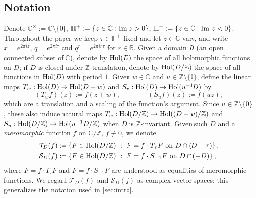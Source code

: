 \documentclass[reqno,11pt]{amsart}
\theoremstyle{definition}
\theoremstyle{remark}
\newtheorem*{remark}{Remark}
\numberwithin{equation}{section}
\newcommand{\Z}{\mathbb{Z}}
\newcommand{\R}{\mathbb{R}}
\newcommand{\C}{\mathbb{C}}
\renewcommand{\H}{{\mathbb{H}}}
\newcommand{\mT}{\mathcal{T}}
\newcommand{\mS}{\mathcal{S}}
\renewcommand{\Im}{\textnormal{Im}\ }
\newcommand{\Hol}{\textnormal{Hol}}
\begin{document}

\subsection{Notation} \label{subsec:notation}
Denote $\C^\times := \C \setminus \{0\}$, $\H^+ := \{z \in \C : \Im z > 0\}$, $\H^- := \{z \in \C : \Im z < 0\}$. Throughout the paper we keep $\tau \in \H^+$ fixed and let $z \in \C$ vary, and write $x = e^{2\pi i z}$, $q = e^{2\pi i \tau}$ and $q^r = e^{2\pi i r \tau}$ for $r \in \R$. Given a domain $D$ (an open connected subset of $\C$), denote by $\Hol(D)$ the space of all holomorphic functions on $D$; if $D$ is closed under $\Z$-translation, denote by $\Hol(D/\Z)$ the space of all functions in $\Hol(D)$ with period $1$. Given $w \in \C$ and $u \in \Z \setminus \{0\}$, define the linear maps $T_w : \Hol(D) \to \Hol(D - w)$ and $S_u : \Hol(D) \to \Hol(u^{-1} D)$ by
\[
    (T_w f)(z) := f(z+w), \qquad\qquad (S_u f)(z) := f(u z),
\]
which are a translation and a scaling of the function's argument. Since $u \in \Z \setminus \{0\}$, these also induce natural maps $T_w : \Hol(D/\Z) \to \Hol((D-w)/\Z)$ and $S_u : \Hol(D/\Z) \to \Hol(u^{-1}D/\Z)$ when $D$ is $\Z$-invariant. Given such $D$ and a \emph{meromorphic} function $f$ on $\C/\Z$, $f \not\equiv 0$, we denote
\begin{align}
    \mT_D(f) &:= \left\{F \in \Hol(D/\Z)\ :\ F = f \cdot T_\tau F \text{ on } D \cap (D - \tau)\right\}, \label{eq:T-spaces} \\
    \mS_D(f) &:= \left\{F \in \Hol(D/\Z)\ :\ F = f \cdot S_{-1} F \text{ on } D \cap (-D)\right\}, \label{eq:S-spaces}
\end{align}
where $F = f \cdot T_\tau F$ and $F = f \cdot S_{-1}F$ are understood as equalities of meromorphic functions. We regard $\mT_D(f)$ and $\mS_D(f)$ as complex vector spaces; this generalizes the notation used in \cref{sec:intro}. 
\end{document}
